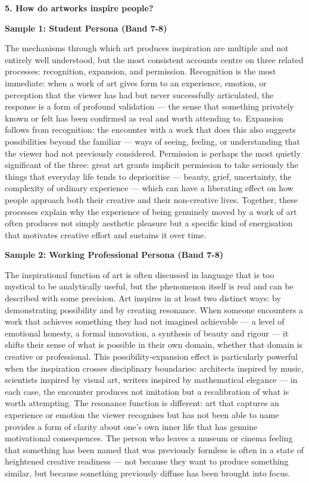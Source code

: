 \separator

\begin{ieltsquestion}
\textbf{5. How do artworks inspire people?}
\end{ieltsquestion}
\textbf{Sample 1: Student Persona (Band 7-8)}

The mechanisms through which art produces inspiration are multiple and not entirely well understood, but the most consistent accounts centre on three related processes: recognition, expansion, and permission. Recognition is the most immediate: when a work of art gives form to an experience, emotion, or perception that the viewer has had but never successfully articulated, the response is a form of profound validation — the sense that something privately known or felt has been confirmed as real and worth attending to. Expansion follows from recognition: the encounter with a work that does this also suggests possibilities beyond the familiar — ways of seeing, feeling, or understanding that the viewer had not previously considered. Permission is perhaps the most quietly significant of the three: great art grants implicit permission to take seriously the things that everyday life tends to deprioritise — beauty, grief, uncertainty, the complexity of ordinary experience — which can have a liberating effect on how people approach both their creative and their non-creative lives. Together, these processes explain why the experience of being genuinely moved by a work of art often produces not simply aesthetic pleasure but a specific kind of energisation that motivates creative effort and sustains it over time.

\textbf{Sample 2: Working Professional Persona (Band 7-8)}

The inspirational function of art is often discussed in language that is too mystical to be analytically useful, but the phenomenon itself is real and can be described with some precision. Art inspires in at least two distinct ways: by demonstrating possibility and by creating resonance. When someone encounters a work that achieves something they had not imagined achievable — a level of emotional honesty, a formal innovation, a synthesis of beauty and rigour — it shifts their sense of what is possible in their own domain, whether that domain is creative or professional. This possibility-expansion effect is particularly powerful when the inspiration crosses disciplinary boundaries: architects inspired by music, scientists inspired by visual art, writers inspired by mathematical elegance — in each case, the encounter produces not imitation but a recalibration of what is worth attempting. The resonance function is different: art that captures an experience or emotion the viewer recognises but has not been able to name provides a form of clarity about one's own inner life that has genuine motivational consequences. The person who leaves a museum or cinema feeling that something has been named that was previously formless is often in a state of heightened creative readiness — not because they want to produce something similar, but because something previously diffuse has been brought into focus.


